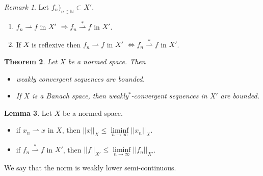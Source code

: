 \documentclass[a4paper, 12pt]{article}
\theoremstyle{plain}
\newtheorem{theorem}{Theorem}[subsection] %
\theoremstyle{definition}
\theoremstyle{lemma}
\newtheorem{lemma}[theorem]{Lemma}
\theoremstyle{remark}
\newtheorem{remark}[theorem]{Remark}
\theoremstyle{corollary}
\theoremstyle{example}
\begin{document}
	\begin{remark}
		Let $f_n)_{n \in \mathbb{N}} \subset X'$. \begin{enumerate}
			\item $f_n \rightharpoonup f$ in $X'$ $\Rightarrow f_n \overset{*}{\rightharpoonup} f$ in $X'$.
			\item If $X$ is reflexive then $f_n \rightharpoonup f$ in $X'$ $\Leftrightarrow f_n \overset{*}{\rightharpoonup} f$ in $X'$.
		\end{enumerate}
	\end{remark}
	\begin{theorem}
		Let $X$ be a normed space. Then \begin{itemize}
			\item weakly convergent sequences are bounded.
			\item If $X$ is a Banach space, then weakly$^*$-convergent sequences in $X'$ are bounded.
		\end{itemize}
	\end{theorem}
	\begin{lemma}
		Let $X$ be a normed space. \begin{itemize}
			\item if $x_n \rightharpoonup x$ in $X$, then $||x||_X \leq \liminf\limits_{n \to \infty} ||x_n||_X$.
			\item if $f_n \overset{*}{\rightharpoonup} f$ in $X'$, then $||f||_{X'} \leq \liminf\limits_{n \to \infty} ||f_n||_{X'}$.
		\end{itemize}
		We say that the norm is weakly lower semi-continuous.
	\end{lemma}
\end{document}
